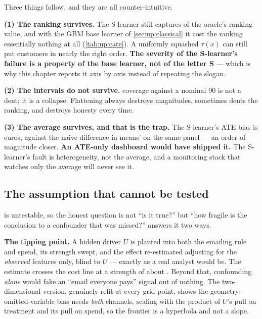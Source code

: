 

Three things follow, and they are all counter-intuitive.

\textbf{(1) The ranking survives.} The S-learner still captures \pc{\nbOneSlAuucPct} of the
oracle's ranking value, and with the GBM base learner of \cref{sec:up:classical} it cost the
ranking essentially nothing at all (\cref{tab:up:cate}). A uniformly squashed $\tau(x)$ can still
put customers in nearly the right order. \textbf{The severity of the S-learner's failure is a
property of the base learner, not of the letter S} --- which is why this chapter reports it axis
by axis instead of repeating the slogan.

\textbf{(2) The intervals do not survive.} \pc{\nbOneSlCov} coverage against a nominal 90 is not a
dent; it is a collapse. Flattening always destroys magnitudes, sometimes dents the ranking, and
destroys honesty every time.

\textbf{(3) The average survives, and that is the trap.} The S-learner's ATE bias is
\nbOneSlAteBias{} euros, against the naive difference in means' \nbOneNaiveAteBias{} on the same
panel --- an order of magnitude closer. \textbf{An ATE-only dashboard would have shipped it.} The
S-learner's fault is heterogeneity, not the average, and a monitoring stack that watches only the
average will never see it.

\subsection*{The assumption that cannot be tested}

 is untestable, so the honest question is not ``is it true?'' but ``how fragile
is the conclusion to a confounder that was missed?''  answers it two ways.

\textbf{The tipping point.} A hidden driver $U$ is planted into both the emailing rule and spend,
its strength swept, and the effect re-estimated adjusting for the \emph{observed} features only,
blind to $U$ --- exactly as a real analyst would be. The estimate crosses the \eur{\nbOneCost}
cost line at a strength of about \nbOneTipping. Beyond that, confounding \emph{alone} would fake
an ``email everyone pays'' signal out of nothing. The two-dimensional version, genuinely refit at
every grid point, shows the geometry: omitted-variable bias needs \emph{both} channels, scaling
with the product of $U$'s pull on treatment and its pull on spend, so the frontier is a hyperbola
and not a slope.

